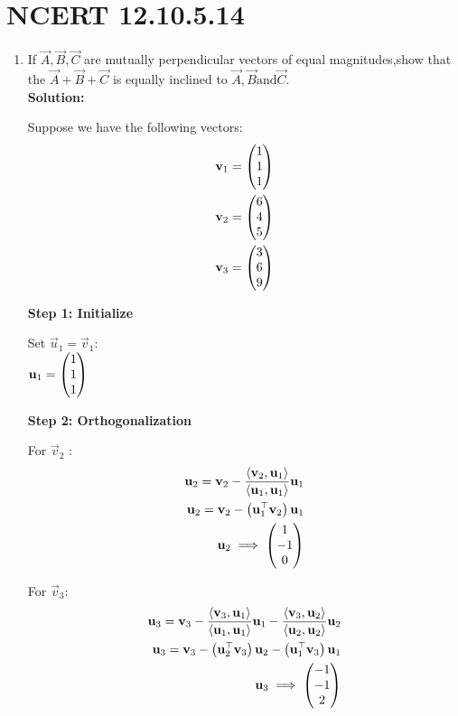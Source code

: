 \documentclass[11pt]{book}
\begin{document}
\section*{NCERT 12.10.5.14}
\begin{enumerate}
    \item If $ \vec{A},\vec{B},\vec{C} $ are mutually perpendicular vectors of equal magnitudes,show that the  $ \vec{A}+\vec{B}+\vec{C} $ is equally inclined to $ \vec{A},\vec{B}  \text{and}  \vec{C} $.\\
    \textbf{Solution:}
    
    Suppose we have the following vectors:
    \begin{align*}
        \mathbf{v}_1 = \begin{pmatrix}1 \\1 \\1\end{pmatrix}  \\
        \mathbf{v}_2 = \begin{pmatrix}6\\ 4\\ 5\end{pmatrix}  \\
        \mathbf{v}_3 = \begin{pmatrix}3 \\6\\ 9\end{pmatrix}
    \end{align*}
        

\textbf{Step 1: Initialize}

Set $\vec{u}_1 = \vec{v}_1$:\\

 $\mathbf{u}_1 = \begin{pmatrix}1\\1\\1\end{pmatrix}$
 

\textbf{Step 2: Orthogonalization}

For  $ \vec{v}_2$ :
 \begin{align}
     \mathbf{u}_2 = \mathbf{v}_2 - \frac{\langle \mathbf{v}_2, \mathbf{u}_1 \rangle}{\langle \mathbf{u}_1, \mathbf{u}_1 \rangle} \mathbf{u}_1 \\
     \mathbf{u}_2=\mathbf{v}_2- \left(\mathbf{u}_1 ^\top \mathbf{v}_2\right) \mathbf{u}_1\\ 
     \mathbf{u}_2\implies \begin{pmatrix}1\\-1\\0\end{pmatrix}
 \end{align}

For $\vec{v}_3 $:
\begin{align}
    \mathbf{u}_3 = \mathbf{v}_3 - \frac{\langle \mathbf{v}_3, \mathbf{u}_1 \rangle}{\langle \mathbf{u}_1, \mathbf{u}_1 \rangle} \mathbf{u}_1 - \frac{\langle \mathbf{v}_3, \mathbf{u}_2 \rangle}{\langle \mathbf{u}_2, \mathbf{u}_2 \rangle} \mathbf{u}_2 \\
    \mathbf{u}_3=\mathbf{v}_3- \left(\mathbf{u}_2 ^\top \mathbf{v}_3\right) \mathbf{u}_2- \left(\mathbf{u}_1 ^\top \mathbf{v}_3\right) \mathbf{u}_1\\ 
\mathbf{u}_3\implies \begin{pmatrix}-1\\-1\\2\end{pmatrix}
\end{align}


\end{enumerate}
\end{document}
